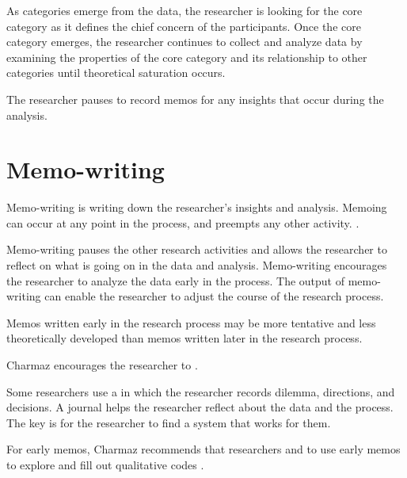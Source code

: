 As categories emerge from the data, the researcher is looking for the core category as it defines the chief concern of the participants. Once the core category emerges, the researcher continues to collect and analyze data by examining the properties of the core category and its relationship to other categories until theoretical saturation occurs.

The researcher pauses to record memos for any insights that occur during the analysis.
\section{Memo-writing}
Memo-writing is writing down the researcher's insights and analysis. Memoing can occur at any point in the process, and preempts any other activity.   \cite{Charmaz}. 

Memo-writing pauses the other research activities and allows the researcher to reflect on what is going on in the data and analysis. Memo-writing encourages the researcher to analyze the data early in the process. The output of memo-writing can enable the researcher to adjust the course of the research process.

Memos written early in the research process may be more tentative and less theoretically developed than memos written later in the research process. 

Charmaz encourages the researcher to  \cite{Charmaz}.

Some researchers use a  in which the researcher records dilemma, directions, and decisions. A journal helps the researcher reflect about the data and the process.  The key is for the researcher to find a system that works for them.

For early memos, Charmaz recommends that researchers  and to {use early memos to explore and fill out qualitative codes} \cite{Charmaz}. 

